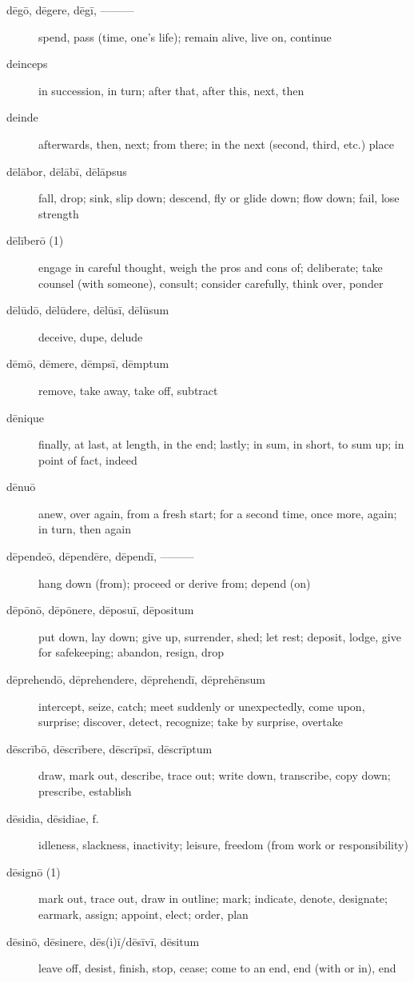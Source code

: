 \begin{description}
    \item[dēgō, dēgere, dēgī, ———] spend, pass (time, one's life); remain alive, live on, continue
    \item[deinceps] in succession, in turn; after that, after this, next, then
    \item[deinde] \marginnote{*}afterwards, then, next; from there; in the next (second, third, etc.) place
    \item[dēlābor, dēlābī, dēlāpsus] fall, drop; sink, slip down; descend, fly or glide down; flow down; fail, lose strength
    \item[dēlīberō (1)] engage in careful thought, weigh the pros and cons of; deliberate; take counsel (with someone), consult; consider carefully, think over, ponder
    \item[dēlūdō, dēlūdere, dēlūsī, dēlūsum] deceive, dupe, delude
    \item[dēmō, dēmere, dēmpsī, dēmptum] remove, take away, take off, subtract
    \item[dēnique] \marginnote{*}finally, at last, at length, in the end; lastly; in sum, in short, to sum up; in point of fact, indeed
    \item[dēnuō] anew, over again, from a fresh start; for a second time, once more, again; in turn, then again
    \item[dēpendeō, dēpendēre, dēpendī, ———] hang down (from); proceed or derive from; depend (on)
    \item[dēpōnō, dēpōnere, dēposuī, dēpositum] put down, lay down; give up, surrender, shed; let rest; deposit, lodge, give for safekeeping; abandon, resign, drop
    \item[dēprehendō, dēprehendere, dēprehendī, dēprehēnsum] intercept, seize, catch; meet suddenly or unexpectedly, come upon, surprise; discover, detect, recognize; take by surprise, overtake
    \item[dēscrībō, dēscrībere, dēscrīpsī, dēscrīptum] draw, mark out, describe, trace out; write down, transcribe, copy down; prescribe, establish
    \item[dēsidia, dēsidiae, f.] idleness, slackness, inactivity; leisure, freedom (from work or responsibility)
    \item[dēsignō (1)] mark out, trace out, draw in outline; mark; indicate, denote, designate; earmark, assign; appoint, elect; order, plan
    \item[dēsinō, dēsinere, dēs(i)ī/dēsīvī, dēsitum] \marginnote{*}leave off, desist, finish, stop, cease; come to an end, end (with or in), end

\end{description}
